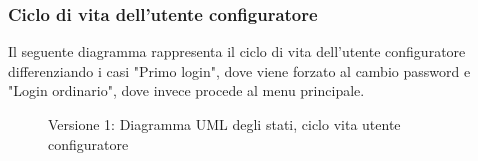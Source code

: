 \subsubsection{Ciclo di vita dell'utente configuratore}
Il seguente diagramma rappresenta il ciclo di vita dell'utente configuratore differenziando i casi "Primo login", dove 
viene forzato al cambio password e "Login ordinario", dove invece procede al menu principale.
\vspace{0.5cm}
\begin{figure}[H]
    \centering
    \caption{Versione 1: Diagramma UML degli stati, ciclo  vita utente configuratore}
    \label{fig:states_config_user_lifecycle}
\end{figure}